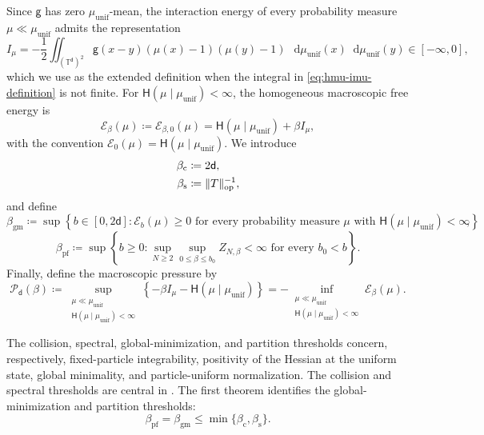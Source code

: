 \documentclass[11pt,reqno]{amsart}
\numberwithin{equation}{section}
\theoremstyle{plain}
\theoremstyle{definition}
\DeclarePairedDelimiter{\norm}{\lVert}{\rVert}
\renewcommand{\d}{\mathsf d}
\newcommand{\dd}{\mathop{}\!\mathrm d}
\newcommand{\T}{\mathbb T}
\newcommand{\op}{\mathrm{op}}
\newcommand{\be}{\beta}
\newcommand{\g}{\mathsf g}
\newcommand{\Hr}{\mathsf H}
\newcommand{\Ec}{\mathcal E}
\newcommand{\Pc}{\mathcal P}
\newcommand{\muunif}{\mu_{\mathrm{unif}}}
\newcommand{\gm}{\mathrm{gm}}
\newcommand{\pf}{\mathrm{pf}}
\newcommand{\spec}{\mathrm{s}}
\newcommand{\coll}{\mathrm{c}}
\begin{document}
Since $\g$ has zero $\muunif$-mean, the interaction energy of every probability measure $\mu\ll\muunif$ admits the representation
\begin{equation}
 I_{\mu}
 =-\frac12\iint_{(\T^{\d})^2}\g(x-y)
 (\mu(x)-1)(\mu(y)-1)\,\dd\muunif(x)\dd\muunif(y)
 \in[-\infty,0],
 \label{eq:macroscopic-energy}
\end{equation}
which we use as the extended definition when the integral in \eqref{eq:hmu-imu-definition} is not finite.
For $\Hr(\mu\mid\muunif)<\infty$, the homogeneous macroscopic free energy is
\begin{equation}
 \Ec_{\be}(\mu)
 \coloneqq\Ec_{\be,0}(\mu)
 =\Hr(\mu\mid\muunif)+\be I_{\mu},
 \label{eq:macroscopic-free-energy}
\end{equation}
with the convention $\Ec_0(\mu)=\Hr(\mu\mid\muunif)$.  We introduce
\begin{align}
 \beta_{\coll}&\coloneqq2\d,
 \label{eq:collision-threshold-intro}\\
 \beta_{\spec}&\coloneqq\norm{T}_{\op}^{-1},
 \label{eq:spectral-threshold}
\end{align}
and define
\begin{equation}
 \beta_{\gm}
 \coloneqq\sup\left\{b\in[0,2\d]:
 \Ec_b(\mu)\geq0
 \text{ for every probability measure $\mu$ with $\Hr(\mu\mid\muunif)<\infty$}\right\},
 \label{eq:global-minimization-threshold}
\end{equation}
\begin{equation}
 \beta_{\pf}
 \coloneqq\sup\left\{b\geq0:
 \sup_{N\geq2}\sup_{0\leq\be\leq b_0}Z_{N,\be}<\infty
 \text{ for every }b_0<b\right\}.
 \label{eq:partition-threshold}
\end{equation}
Finally, define the macroscopic pressure by
\begin{equation}
 \Pc_{\d}(\be)
 \coloneqq\sup_{\substack{\mu\ll\muunif\\
 \Hr(\mu\mid\muunif)<\infty}}
 \left\{-\be I_{\mu}-\Hr(\mu\mid\muunif)\right\}
 =-\inf_{\substack{\mu\ll\muunif\\
 \Hr(\mu\mid\muunif)<\infty}}\Ec_{\be}(\mu).
 \label{eq:macroscopic-pressure}
\end{equation}

The collision, spectral, global-minimization, and partition thresholds concern, respectively, fixed-particle integrability, positivity of the Hessian at the uniform state, global minimality, and particle-uniform normalization. The collision and spectral thresholds are central in \cite{ChodrondeCourcelRosenzweigSerfaty2025}. The first theorem identifies the global-minimization and partition thresholds:
\begin{equation}
 \beta_{\pf}=\beta_{\gm}
 \leq\min\{\beta_{\coll},\beta_{\spec}\}.
 \label{eq:threshold-hierarchy-intro}
\end{equation}
\end{document}
